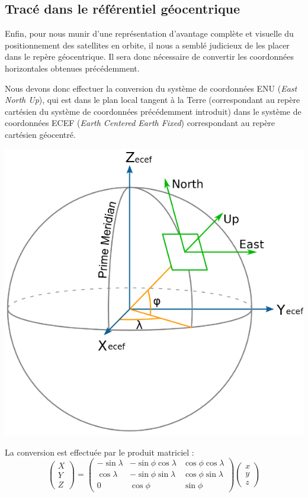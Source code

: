    \subsection{Tracé dans le référentiel géocentrique}\label{subsec:trace-dans-le-referentiel-geocentrique}
      Enfin, pour nous munir d'une représentation d'avantage complète et visuelle du positionnement des satellites en orbite, il nous a semblé judicieux de les placer dans le repère géocentrique.
      Il sera donc nécessaire de convertir les coordonnées horizontales obtenues précédemment.

      Nous devons donc effectuer la conversion du système de coordonnées ENU (\textit{East North Up}), qui est dans le plan local tangent à la Terre (correspondant au repère cartésien du système de coordonnées précédemment introduit) dans le système de coordonnées ECEF (\textit{Earth Centered Earth Fixed}) correspondant au repère cartésien géocentré.
      \begin{center}
         \includegraphics[width=.35\textwidth]{imgs/enutoecef}
      \end{center}

      La conversion est effectuée par le produit matriciel :
      \[
         \begin{pmatrix}
            X \\
            Y \\
            Z
         \end{pmatrix} =
         \begin{pmatrix}
            -\sin\lambda & -\sin\phi\cos\lambda & \cos\phi\cos\lambda \\
            \cos\lambda  & -\sin\phi\sin\lambda & \cos\phi\sin\lambda \\
            0            & \cos\phi             & \sin\phi
         \end{pmatrix}
         \begin{pmatrix}
            x \\
            y \\
            z
         \end{pmatrix}
      \]

